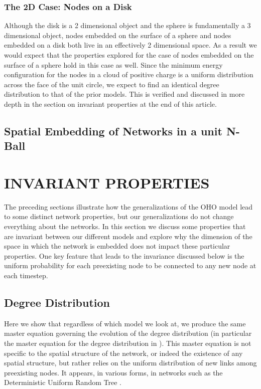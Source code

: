 \documentclass[aps,pre,reprint,superscriptaddress,amsmath,amssymb]{revtex4-1}
\begin{document}
\subsubsection{The 2D Case: Nodes on a Disk}
Although the disk is a 2 dimensional object and the sphere is fundamentally a 3 dimensional object, nodes embedded on the surface of a sphere and nodes embedded on a disk both live in an effectively 2 dimensional space.
As a result we would expect that the properties explored for the case of nodes embedded on the surface of a sphere hold in this case as well.
Since the minimum energy configuration for the nodes in a cloud of positive charge is a uniform distribution across the face of the unit circle, we expect to find an identical degree distribution to that of the prior models.
This is verified and discussed in more depth in the section on invariant properties at the end of this article.

\subsection{Spatial Embedding of Networks in a unit N-Ball}

\section{INVARIANT PROPERTIES}
The preceding sections illustrate how the generalizations of the OHO model lead to some distinct network properties, but our generalizations do not change everything about the networks.
In this section we discuss some properties that are invariant between our different models and explore why the dimension of the space in which the network is embedded does not impact these particular properties.
One key feature that leads to the invariance discussed below is the uniform probability for each preexisting node to be connected to any new node at each timestep. 

\subsection{Degree Distribution}
Here we show that regardless of which model we look at, we produce the same master equation governing the evolution of the degree distribution (in particular the master equation for the degree distribution in \cite{ozik2004}).  This master equation is not specific to the spatial structure of the network, or indeed the existence of any spatial structure, but rather relies on the uniform distribution of new links among preexisting nodes.  It appears, in various forms, in networks such as the Deterministic Uniform Random Tree \cite{zhang2008topologies}.
\end{document}
